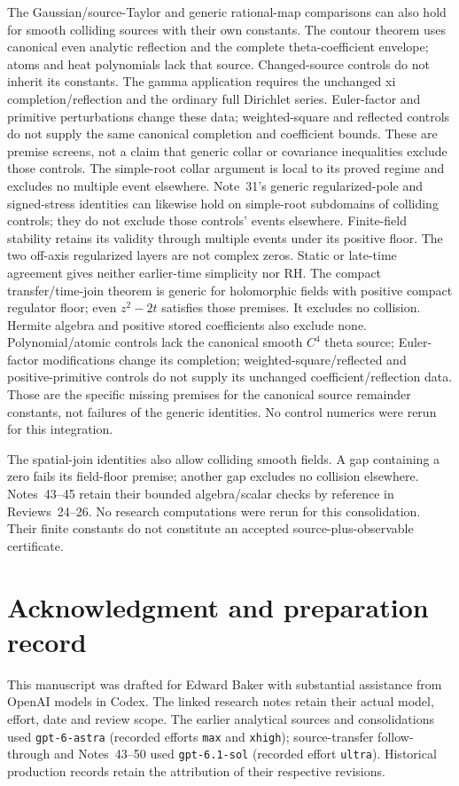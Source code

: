 The Gaussian/source-Taylor and generic rational-map comparisons can
also hold for smooth colliding sources with their own constants. The
contour theorem uses canonical even analytic reflection and the complete
theta-coefficient envelope; atoms and heat polynomials lack that source.
Changed-source controls do not inherit its constants. The gamma
application requires the unchanged xi completion/reflection and the
ordinary full Dirichlet series. Euler-factor and primitive perturbations
change these data; weighted-square and reflected controls do not supply
the same canonical completion and coefficient bounds. These are premise
screens, not a claim that generic collar or covariance inequalities
exclude those controls. The simple-root collar argument is local to its
proved regime and excludes no multiple event elsewhere. Note~31's
generic regularized-pole and signed-stress identities can likewise hold
on simple-root subdomains of colliding controls; they do not exclude
those controls' events elsewhere. Finite-field stability retains its
validity through multiple events under its positive
floor. The two off-axis regularized layers are not complex zeros.
Static or late-time agreement gives neither earlier-time simplicity nor RH.
The compact transfer/time-join theorem is generic for holomorphic fields
with positive compact regulator floor; even $z^2-2t$ satisfies those
premises. It excludes no collision. Hermite algebra and positive stored
coefficients also exclude none. Polynomial/atomic controls lack the
canonical smooth $C^4$ theta source; Euler-factor modifications change its
completion; weighted-square/reflected and positive-primitive controls do
not supply its unchanged coefficient/reflection data. Those are the
specific missing premises for the canonical source remainder constants,
not failures of the generic identities. No control numerics were rerun
for this integration.

The spatial-join identities also allow colliding smooth fields. A gap
containing a zero fails its field-floor premise; another gap excludes no
collision elsewhere. Notes~43--45 retain their bounded algebra/scalar
checks by reference in Reviews~24--26. No research computations were
rerun for this consolidation. Their finite constants do not constitute
an accepted source-plus-observable certificate.

\section*{Acknowledgment and preparation record}
This manuscript was drafted for Edward Baker with substantial assistance
from OpenAI models in Codex. The linked research notes retain their actual
model, effort, date and review scope. The earlier analytical sources and
consolidations used \texttt{gpt-6-astra} (recorded efforts \texttt{max}
and \texttt{xhigh}); source-transfer follow-through and Notes~43--50
used \texttt{gpt-6.1-sol} (recorded effort \texttt{ultra}). Historical
production records retain the attribution of their respective revisions.

